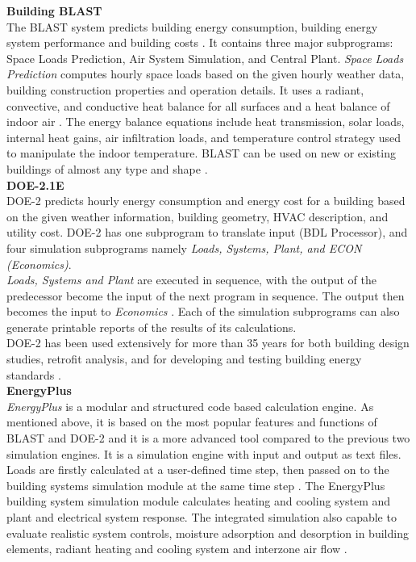 \documentclass[a4paper, oneside]{discothesis}
\begin{document}
		\textbf{Building BLAST}\\
			The BLAST system predicts building energy consumption, building energy system performance and building costs \cite{crawley2008contrasting}. It contains three major subprograms: Space Loads Prediction, Air System Simulation, and Central Plant. \textit{Space Loads Prediction} computes hourly space loads based on the given hourly weather data, building construction properties and operation details. It uses a radiant, convective, and conductive heat balance for all surfaces and a heat balance of indoor air \cite{crawley2008contrasting}. The energy balance equations include heat transmission, solar loads, internal heat gains, air infiltration loads, and temperature control strategy used to manipulate the indoor temperature. BLAST can be used on new or existing buildings of almost any type and shape \cite{crawley2008contrasting}.\\

		\textbf{DOE-2.1E}\\
			DOE-2 predicts hourly energy consumption and energy cost for a building based on the given weather information, building geometry, HVAC description, and utility cost. DOE-2 has one subprogram to translate input (BDL Processor), and four simulation subprograms namely \textit{Loads, Systems, Plant, and ECON (Economics)}.\\
			\textit{Loads, Systems and Plant} are executed in sequence, with the output of the predecessor become the input of the next program in sequence. The output then becomes the input to \textit{Economics} \cite{crawley2008contrasting}. Each of the simulation subprograms can also generate printable reports of the results of its calculations.\\
			DOE-2 has been used extensively for more than 35 years for both building design studies, retrofit analysis, and for developing and testing building energy standards \cite{crawley2008contrasting}.\\
		

		\textbf{EnergyPlus}\\
			\textit{EnergyPlus} is a modular and structured code based calculation engine. As mentioned above, it is based on the most popular features and functions of BLAST and DOE-2 and it is a more advanced tool compared to the previous two simulation engines. It is a simulation engine with input and output as text files. Loads are firstly calculated at a user-defined time step, then passed on to the building systems simulation module at the same time step \cite{crawley2008contrasting}. The EnergyPlus building system simulation module calculates heating and cooling system and plant and electrical system response. The integrated simulation also capable to evaluate realistic system controls, moisture adsorption and desorption in building elements, radiant heating and cooling system and interzone air flow \cite{crawley2008contrasting}.\\
\end{document}
